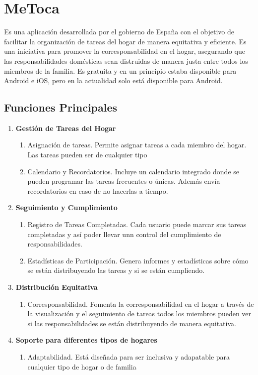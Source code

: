 \documentclass{article}
\begin{document}
\section{MeToca}
Es una aplicación desarrollada por el gobierno de España con el objetivo de facilitar la organización de tareas del hogar
de manera equitativa y eficiente. Es una iniciativa para promover la corresponsabilidad en el hogar, asegurando que las
responsabilidades domésticas sean distruidas de manera justa entre todos los miembros de la familia. Es gratuita y 
en un principio estaba disponible para Android e iOS, pero en la actualidad solo está disponible para Android.
\subsection{Funciones Principales}

\begin{enumerate}
    \item \textbf{Gestión de Tareas del Hogar}
    \begin{enumerate}
        \item Asignación de tareas. Permite asignar tareas a cada miembro del hogar. Las tareas pueden ser de cualquier tipo
        \item Calendario y Recordatorios. Incluye un calendario integrado donde se pueden programar las tareas frecuentes o únicas.
        Además envía recordatorios en caso de no hacerlas a tiempo.
    \end{enumerate}
    \item \textbf{Seguimiento y Cumplimiento}
    \begin{enumerate}
        \item Registro de Tareas Completadas. Cada usuario puede marcar sus tareas completadas y así poder llevar unn control del cumplimiento de responsabilidades.
        \item Estadísticas de Participación. Genera informes y estadísticas sobre cómo se están distribuyendo las tareas y si se están cumpliendo.
    \end{enumerate}
    \item \textbf{Distribución Equitativa}
    \begin{enumerate}
        \item Corresponsabilidad. Fomenta la corresponsabilidad en el hogar a través de la visualización 
        y el seguimiento de tareas todos los miembros pueden ver si las responsabilidades se están distribuyendo de manera equitativa.
    \end{enumerate}
    \item \textbf{Soporte para diferentes tipos de hogares}
    \begin{enumerate}
        \item Adaptabilidad. Está diseñada para ser inclusiva y adapatable para cualquier tipo de hogar o de familia
        \end{enumerate}
\end{enumerate}
\end{document}
